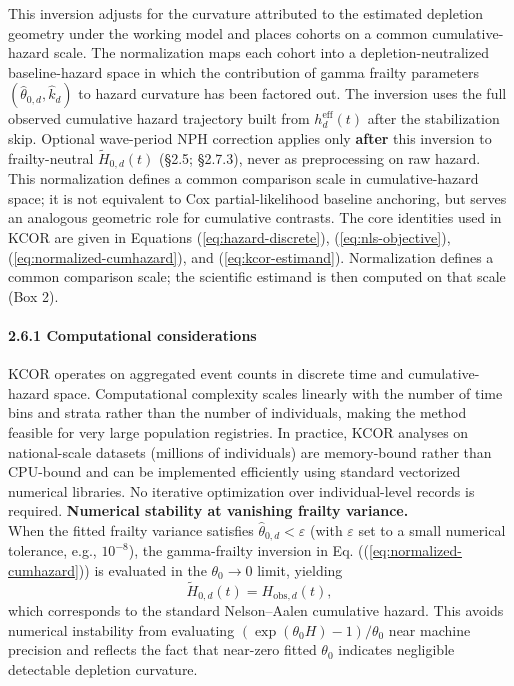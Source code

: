 \documentclass[
]{article}
\begin{document}
This inversion adjusts for the curvature attributed to the estimated
depletion geometry under the working model and places cohorts on a
common cumulative-hazard scale. The normalization maps each cohort into
a depletion-neutralized baseline-hazard space in which the contribution
of gamma frailty parameters \((\hat{\theta}_{0,d}, \hat{k}_d)\) to
hazard curvature has been factored out. The inversion uses the full
observed cumulative hazard trajectory built from
\(h_d^{\mathrm{eff}}(t)\) after the stabilization skip. Optional
wave-period NPH correction applies only \textbf{after} this inversion to
frailty-neutral \(\tilde H_{0,d}(t)\) (§2.5; §2.7.3), never as
preprocessing on raw hazard. This normalization defines a common
comparison scale in cumulative-hazard space; it is not equivalent to Cox
partial-likelihood baseline anchoring, but serves an analogous geometric
role for cumulative contrasts. The core identities used in KCOR are
given in Equations (\ref{eq:hazard-discrete}), (\ref{eq:nls-objective}),
(\ref{eq:normalized-cumhazard}), and (\ref{eq:kcor-estimand}).
Normalization defines a common comparison scale; the scientific estimand
is then computed on that scale (Box 2).

\paragraph{2.6.1 Computational
considerations}\label{computational-considerations}

KCOR operates on aggregated event counts in discrete time and
cumulative-hazard space. Computational complexity scales linearly with
the number of time bins and strata rather than the number of
individuals, making the method feasible for very large population
registries. In practice, KCOR analyses on national-scale datasets
(millions of individuals) are memory-bound rather than CPU-bound and can
be implemented efficiently using standard vectorized numerical
libraries. No iterative optimization over individual-level records is
required. \textbf{Numerical stability at vanishing frailty variance.}\\
When the fitted frailty variance satisfies
\(\hat\theta_{0,d} < \varepsilon\) (with \(\varepsilon\) set to a small
numerical tolerance, e.g., \(10^{-8}\)), the gamma-frailty inversion in
Eq. ((\ref{eq:normalized-cumhazard})) is evaluated in the
\(\theta_0 \to 0\) limit, yielding \[
\tilde H_{0,d}(t)=H_{\mathrm{obs},d}(t),
\] which corresponds to the standard Nelson--Aalen cumulative hazard.
This avoids numerical instability from evaluating
\((\exp(\theta_0 H)-1)/\theta_0\) near machine precision and reflects
the fact that near-zero fitted \(\theta_0\) indicates negligible
detectable depletion curvature.
\end{document}
